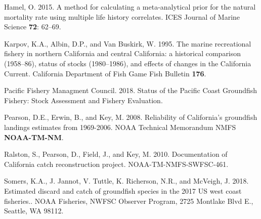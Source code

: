 \documentclass[12pt,]{article}
\begin{document}
\hypertarget{ref-Hamel2015}{}
Hamel, O. 2015. A method for calculating a meta-analytical prior for the
natural mortality rate using multiple life history correlates. ICES
Journal of Marine Science \textbf{72}: 62--69.

\hypertarget{ref-Karpov1995}{}
Karpov, K.A., Albin, D.P., and Van Buskirk, W. 1995. The marine
recreational fishery in northern California and central California: a
historical comparison (1958--86), status of stocks (1980--1986), and
effects of changes in the California Current. California Department of
Fish Game Fish Bulletin \textbf{176}.

\hypertarget{ref-PSMFC2018}{}
Pacific Fishery Managment Council. 2018. Status of the Pacific Coast
Groundfish Fishery: Stock Assessment and Fishery Evaluation.

\hypertarget{ref-Pearson2008}{}
Pearson, D.E., Erwin, B., and Key, M. 2008. Reliability of California's
groundfish landings estimates from 1969-2006. NOAA Technical Memorandum
NMFS \textbf{NOAA-TM-NM}.

\hypertarget{ref-Ralston2010}{}
Ralston, S., Pearson, D., Field, J., and Key, M. 2010. Documentation of
California catch reconstruction project. NOAA-TM-NMFS-SWFSC-461.

\hypertarget{ref-Somers2018}{}
Somers, K.A., J. Jannot, V. Tuttle, K. Richerson, N.R., and McVeigh, J.
2018. Estimated discard and catch of groundfish species in the 2017 US
west coast fisheries.. NOAA Fisheries, NWFSC Observer Program, 2725
Montlake Blvd E., Seattle, WA 98112.
\end{document}
